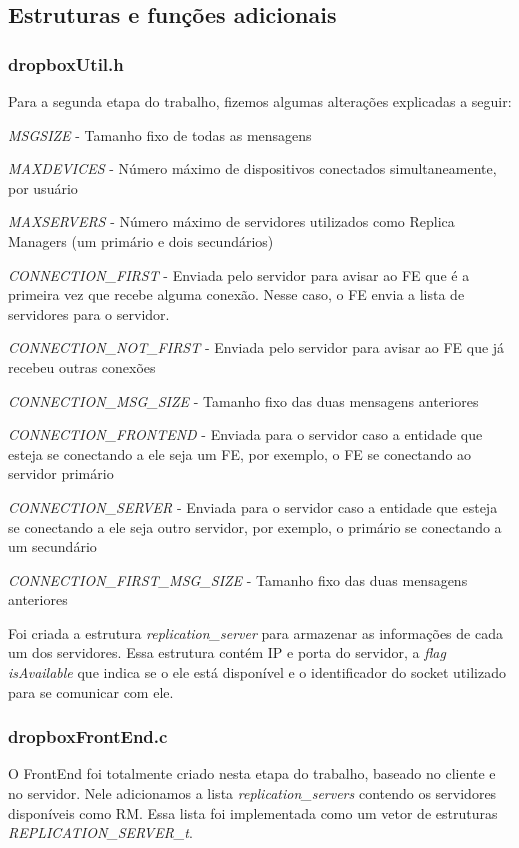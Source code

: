 \documentclass[a4paper]{article}
\begin{document}
\subsection{Estruturas e funções adicionais}
\subsubsection{dropboxUtil.h}
Para a segunda etapa do trabalho, fizemos algumas alterações explicadas a seguir:


\textit{MSGSIZE} - Tamanho fixo de todas as mensagens

\textit{MAXDEVICES} -  Número máximo de dispositivos conectados simultaneamente, por usuário

\textit{MAXSERVERS} - Número máximo de servidores utilizados como Replica Managers (um primário e dois secundários)

\textit{CONNECTION\_FIRST} - Enviada pelo servidor para avisar ao FE que é a primeira vez que recebe alguma conexão. Nesse caso, o FE envia a lista de servidores para o servidor.

\textit{CONNECTION\_NOT\_FIRST} - Enviada pelo servidor para avisar ao FE que já recebeu outras conexões

\textit{CONNECTION\_MSG\_SIZE} - Tamanho fixo das duas mensagens anteriores

\textit{CONNECTION\_FRONTEND} - Enviada para o servidor caso a entidade que esteja se conectando a ele seja um FE, por exemplo, o FE se conectando ao servidor primário

\textit{CONNECTION\_SERVER} - Enviada para o servidor caso a entidade que esteja se conectando a ele seja outro servidor, por exemplo, o primário se conectando a um secundário

\textit{CONNECTION\_FIRST\_MSG\_SIZE} - Tamanho fixo das duas mensagens anteriores

\hfill \hfill \hfill

Foi criada a estrutura \textit{replication\_server} para armazenar as informações de cada um dos servidores. Essa estrutura contém IP e porta do servidor, a \textit{flag isAvailable} que indica se o ele está disponível e o identificador do socket utilizado para se comunicar com ele.

\subsubsection{dropboxFrontEnd.c}

O FrontEnd foi totalmente criado nesta etapa do trabalho, baseado no cliente e no servidor.  Nele adicionamos a lista \textit{replication\_servers} contendo os servidores disponíveis como RM. Essa lista foi implementada como um vetor de estruturas \textit{REPLICATION\_SERVER\_t}.
\end{document}
